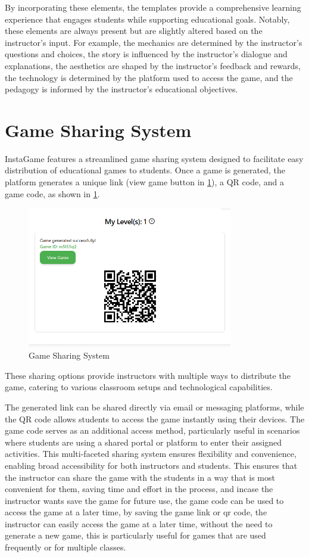 By incorporating these elements, the templates provide a comprehensive learning experience that engages students while supporting educational goals. Notably, these elements are always present but are slightly altered based on the instructor's input. For example, the mechanics are determined by the instructor's questions and choices, the story is influenced by the instructor's dialogue and explanations, the aesthetics are shaped by the instructor's feedback and rewards, the technology is determined by the platform used to access the game, and the pedagogy is informed by the instructor's educational objectives.


\section{Game Sharing System}

InstaGame features a streamlined game sharing system designed to facilitate easy distribution of educational games to students. Once a game is generated, the platform generates a unique link (view game button in \ref{fig:shareGame}), a QR code, and a game code, as shown in \ref{fig:shareGame}. 
\begin{figure}
	\centering
	\includegraphics[width=0.8\textwidth]{figures/Space_Invaders/Instructor_Portal_Space_Invader_Generated_Links.png}
	\caption{Game Sharing System}
	\label{fig:shareGame}
\end{figure}
These sharing options provide instructors with multiple ways to distribute the game, catering to various classroom setups and technological capabilities.

The generated link can be shared directly via email or messaging platforms, while the QR code allows students to access the game instantly using their devices. The game code serves as an additional access method, particularly useful in scenarios where students are using a shared portal or platform to enter their assigned activities. This multi-faceted sharing system ensures flexibility and convenience, enabling broad accessibility for both instructors and students. This ensures that the instructor can share the game with the students in a way that is most convenient for them, saving time and effort in the process, and incase the instructor wants save the game for future use, the game code can be used to access the game at a later time, by saving the game link or qr code, the instructor can easily access the game at a later time, without the need to generate a new game, this is particularly useful for games that are used frequently or for multiple classes.


